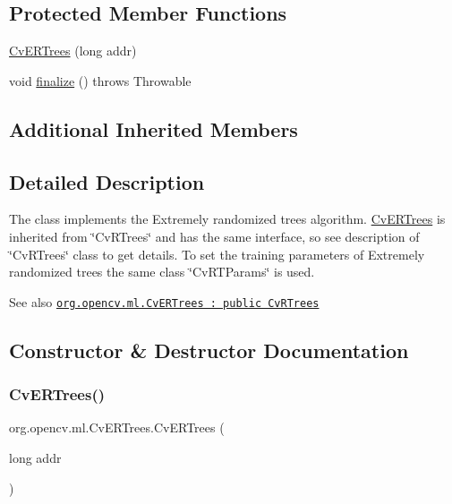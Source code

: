 \subsection*{Protected Member Functions}
\begin{DoxyCompactItemize}
\item 
\mbox{\hyperlink{classorg_1_1opencv_1_1ml_1_1_cv_e_r_trees_a24bbab104082dd95c06a5c096cdc2153}{Cv\+E\+R\+Trees}} (long addr)
\item 
void \mbox{\hyperlink{classorg_1_1opencv_1_1ml_1_1_cv_e_r_trees_a9ac01a5b777ea9b2de40d1094c94e623}{finalize}} ()  throws Throwable 
\end{DoxyCompactItemize}
\subsection*{Additional Inherited Members}


\subsection{Detailed Description}
The class implements the Extremely randomized trees algorithm. {\ttfamily \mbox{\hyperlink{classorg_1_1opencv_1_1ml_1_1_cv_e_r_trees}{Cv\+E\+R\+Trees}}} is inherited from \char`\"{}\+Cv\+R\+Trees\char`\"{} and has the same interface, so see description of \char`\"{}\+Cv\+R\+Trees\char`\"{} class to get details. To set the training parameters of Extremely randomized trees the same class \char`\"{}\+Cv\+R\+T\+Params\char`\"{} is used.

\begin{DoxySeeAlso}{See also}
\href{http://docs.opencv.org/modules/ml/doc/ertrees.html#cvertrees}{\tt org.\+opencv.\+ml.\+Cv\+E\+R\+Trees \+: public Cv\+R\+Trees} 
\end{DoxySeeAlso}


\subsection{Constructor \& Destructor Documentation}
\mbox{\label{classorg_1_1opencv_1_1ml_1_1_cv_e_r_trees_a24bbab104082dd95c06a5c096cdc2153}} 
\subsubsection{\texorpdfstring{Cv\+E\+R\+Trees()}{CvERTrees()}\hspace{0.1cm}{\footnotesize\ttfamily [1/2]}}
{\footnotesize\ttfamily org.\+opencv.\+ml.\+Cv\+E\+R\+Trees.\+Cv\+E\+R\+Trees (\begin{DoxyParamCaption}\item[{long}]{addr }\end{DoxyParamCaption})\hspace{0.3cm}{\ttfamily [protected]}}

